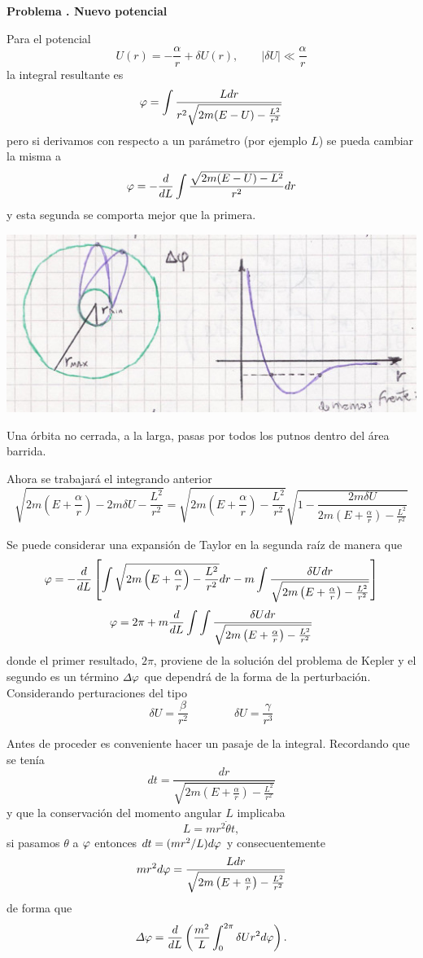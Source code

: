 \documentclass[10pt,oneside]{CBFT_book}
\begin{document}
\begin{ejemplo}{\bf Problema . Nuevo potencial}

Para el potencial 
\[
	U(r) = -\frac{\alpha}{r} + \delta U(r), \qquad |\delta U| \ll \frac{\alpha}{r}
\]
la integral resultante es
\[
	\varphi = \int \frac{L dr }{r^2\sqrt{2m(E-U)-\frac{L^2}{r^2}}}
\]
pero si derivamos con respecto a un parámetro (por ejemplo $L$) se pueda cambiar la misma a 
\[
	\varphi = - \frac{d^{\hspace{-0.05em}} {}}{d {L}^{\hspace{-0.05em}}} \int \frac{ \sqrt{2m(E-U)- L^2} }{r^2}dr
\]
y esta segunda se comporta mejor que la primera.

\includegraphics[scale=0.35]{images/fig_mc_potencial_central_problema.jpg}

Una órbita no cerrada, a la larga, pasas por todos los putnos dentro del área barrida.

Ahora se trabajará el integrando anterior
\[
\sqrt{ 2m \left(E+ \frac{\alpha}{r}\right) - 2m\delta U - \frac{L^2}{r^2} } =
\sqrt{ 2m \left(E+ \frac{\alpha}{r}\right) - \frac{L^2}{r^2} } 
\sqrt{ 1 - \frac{ 2m\delta U }{ 2m \left(E+ \frac{\alpha}{r}\right) - \frac{L^2}{r^2} }  }
\]

Se puede considerar una expansión de Taylor en la segunda raíz de manera que 
\[
	\varphi = - \frac{d^{\hspace{-0.05em}} {}}{d {L}^{\hspace{-0.05em}}}\left[ \int 
	\sqrt{ 2m \left(E+ \frac{\alpha}{r}\right) - \frac{L^2}{r^2} } dr -
	m \int \frac{ \delta U dr }{ \sqrt{ 2m \left(E+ \frac{\alpha}{r}\right) - \frac{L^2}{r^2} }  }
	\right]
\]
\[
	\varphi = 2 \pi + m \frac{d^{\hspace{-0.05em}} {}}{d {L}^{\hspace{-0.05em}}} 
	\int \int \frac{ \delta U dr }{ \sqrt{ 2m \left(E+ \frac{\alpha}{r}\right) - \frac{L^2}{r^2} }  }
\]
donde el primer resultado, $2\pi$, proviene de la solución del problema de Kepler y el segundo es 
un término $\Delta \varphi$ que dependrá de la forma de la perturbación.
Considerando perturaciones del tipo
\[
	\delta U = \frac{\beta}{r^2} \qquad \qquad \delta U = \frac{\gamma}{r^3}
\]

Antes de proceder es conveniente hacer un pasaje de la integral. Recordando que se tenía
\[
	dt = \frac{dr}{ \sqrt{ 2m \left(E+ \frac{\alpha}{r}\right) - \frac{L^2}{r^2} } }
\]
y que la conservación del momento angular $L$ implicaba
\[
	L = mr^2\dot{\theta}{t},
\]
si pasamos $\theta$ a $\varphi$ entonces $dt = ( mr^2/L ) d\varphi $ y consecuentemente
\[
	m r^2 d\varphi = \frac{ L dr }{ \sqrt{ 2m \left(E+ \frac{\alpha}{r}\right) - \frac{L^2}{r^2} } }
\]
de forma que 
\[
	\Delta \varphi = \frac{d^{\hspace{-0.05em}} {}}{d {L}^{\hspace{-0.05em}}} \left( \frac{m^2}{L} \int_0^{2\pi} \delta U r^2 d\varphi \right).
\]


\end{ejemplo}
\end{document}
